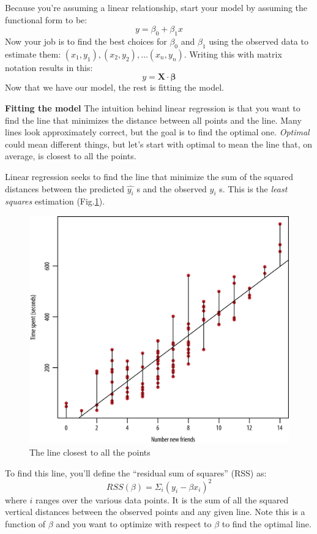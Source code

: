 Because you're assuming a linear relationship, start your model by assuming the functional form to be:
$$
    y=\beta_{0}+\beta_{1} x
$$
Now your job is to find the best choices for \(\beta_{0}\) and \(\beta_{1}\) using the observed data to estimate them: \(\left(x_{1}, y_{1}\right),\left(x_{2}, y_{2}\right), \ldots\left(x_{n}, y_{n}\right)\). Writing this with matrix notation results in this:
$$
    y=\mathbf{X} \cdot \boldsymbol{\beta}
$$
Now that we have our model, the rest is fitting the model.

\textbf{Fitting the model} The intuition behind linear regression is that you want to find the line that minimizes the distance between all points and the line. Many lines look approximately correct, but the goal is to find the optimal one. \textit{Optimal} could mean different things, but let's start with optimal to mean the line that, on average, is closest to all the points.

Linear regression seeks to find the line that minimize the sum of the squared distances between the predicted \(\widehat{y_{i}}\) s and the observed \(y_{i}\) s. This is the \textit{least squares} estimation (Fig.\ref{fig:algo_4}).
\begin{figure}[H]
    \centering
    \includegraphics[width=0.7\linewidth]{imgs/fundamental_algo/algo_4.png}
    \caption{The line closest to all the points}
    \label{fig:algo_4}
\end{figure}
To find this line, you'll define the ``residual sum of squares'' (RSS) as:
\begin{equation}
    R S S(\beta)=\Sigma_{i}\left(y_{i}-\beta x_{i}\right)^{2}
    \label{eq:rss}
\end{equation}
where \(i\) ranges over the various data points. It is the sum of all the squared vertical distances between the observed points and any given line. Note this is a function of \(\beta\) and you want to optimize with respect to \(\beta\) to find the optimal line.

